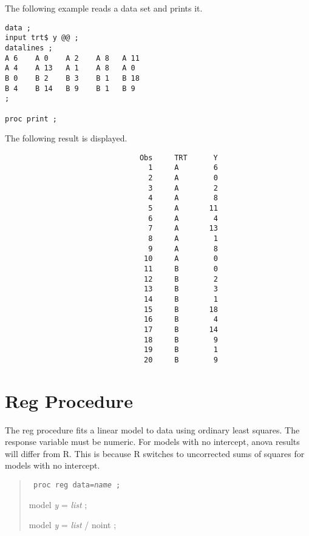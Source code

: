 \documentclass[12pt]{article}
\begin{document}
The following example reads a data set
and prints it.

{\footnotesize\begin{verbatim}
data ;
input trt$ y @@ ;
datalines ;
A 6    A 0    A 2    A 8   A 11
A 4    A 13   A 1    A 8   A 0
B 0    B 2    B 3    B 1   B 18
B 4    B 14   B 9    B 1   B 9
;

proc print ;
\end{verbatim}}

The following result is displayed.

{\footnotesize\begin{verbatim}
                               Obs     TRT      Y
                                 1     A        6
                                 2     A        0
                                 3     A        2
                                 4     A        8
                                 5     A       11
                                 6     A        4
                                 7     A       13
                                 8     A        1
                                 9     A        8
                                10     A        0
                                11     B        0
                                12     B        2
                                13     B        3
                                14     B        1
                                15     B       18
                                16     B        4
                                17     B       14
                                18     B        9
                                19     B        1
                                20     B        9
\end{verbatim}}

\newpage

\section{Reg Procedure}

The reg procedure fits a linear model to data
using ordinary least squares.
The response variable must be numeric.
For models with no intercept, anova results will differ from R.
This is because R switches to uncorrected sums of squares
for models with no intercept.

\begin{quote}
{\tt
proc reg data={\it name} ;

model {\it y} = {\it list} ;

model {\it y} = {\it list} / noint ;
}
\end{quote}
\end{document}
